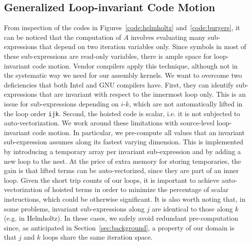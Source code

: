 \documentclass[conference]{IEEEtran}
\begin{document}
\subsection{Generalized Loop-invariant Code Motion}
\label{sec:code-transf-licm}
From inspection of the codes in Figures~\ref{code:helmholtz} and~\ref{code:burgers}, it can be noticed that the computation of $A$ involves evaluating many sub-expressions that depend on two iteration variables only. Since symbols in most of these sub-expressions are read-only variables, there is ample space for loop-invariant code motion. Vendor compilers apply this technique, although not in the systematic way we need for our assembly kernels. We want to overcome two deficiencies that both Intel and GNU compilers have. First, they can identify sub-expressions that are invariant with respect to the innermost loop only. This is an issue for sub-expressions depending on $i$-$k$, which are not automatically lifted in the loop order \texttt{ijk}. Second, the hoisted code is scalar, i.e. it is not subjected to auto-vectorization. We work around these limitations with source-level loop-invariant code motion. In particular, we pre-compute all values that an invariant sub-expression assumes along its fastest varying dimension. This is implemented by introducing a temporary array per invariant sub-expression and by adding a new loop to the nest. At the price of extra memory for storing temporaries, the gain is that lifted terms can be auto-vectorized, since they are part of an inner loop. Given the short trip counts of our loops, it is important to achieve auto-vectorization of hoisted terms in order to minimize the percentage of scalar instructions, which could be otherwise significant. It is also worth noting that, in some problems, invariant sub-expressions along $j$ are identical to those along $k$ (e.g. in Helmholtz). In these cases, we safely avoid redundant pre-computation since, as anticipated in Section~\ref{sec:background}, a property of our domain is that $j$ and $k$ loops share the same iteration space.
\end{document}
